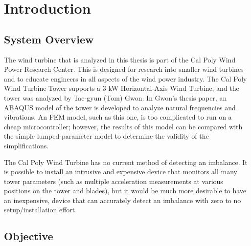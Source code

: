 \chapter{Introduction} %

\label{ch_introduction} %


\section{System Overview}

The wind turbine that is analyzed in this thesis is part of the Cal Poly Wind Power Research Center.  This is designed for research into smaller wind turbines and to educate engineers in all aspects of the wind power industry.  The Cal Poly Wind Turbine Tower supports a 3 kW Horizontal-Axis Wind Turbine, and the tower was analyzed by Tae-gyun (Tom) Gwon\cite{Gwon_paper}.  In Gwon’s thesis paper, an ABAQUS model of the tower is developed to analyze natural frequencies and vibrations.  An FEM model, such as this one, is too complicated to run on a cheap microcontroller; however, the results of this model can be compared with the simple lumped-parameter model to determine the validity of the simplifications.

The Cal Poly Wind Turbine has no current method of detecting an imbalance.  It is possible to install an intrusive and expensive device that monitors all many tower parameters (such as multiple acceleration measurements at various positions on the tower and blades), but it would be much more desirable to have an inexpensive, device that can accurately detect an imbalance with zero to no setup/installation effort.


\section{Objective}

